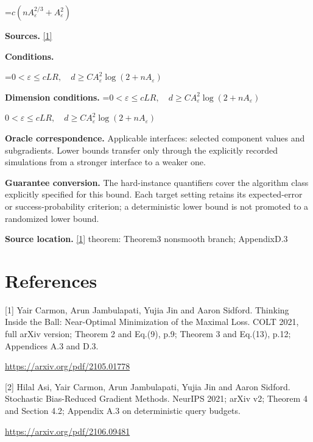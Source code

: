 \documentclass[10pt,a4paper]{article}
\newcommand{\AtlasMath}[1]{\par\begingroup\centering\setbox0=\hbox{$\displaystyle #1$}\ifdim\wd0>1.4\linewidth\typeout{ATLAS WIDE FORMULA: \the\wd0}\fi\ifdim\wd0>\linewidth\resizebox{\linewidth}{!}{\box0}\else\box0\fi\par\endgroup}
\newcommand{\AtlasInlineMath}[1]{\begingroup\setbox0=\hbox{$#1$}\ifdim\wd0>.4\linewidth\endgroup\AtlasMath{#1}\else\endgroup$#1$\fi}
\begin{document}
\AtlasMath{c(nA_\varepsilon^{2/3}+A_\varepsilon^2)}
\textbf{Sources.} \href{https://arxiv.org/pdf/2105.01778}{[1]}

\textbf{Conditions.} 
\AtlasMath{0<\varepsilon\le cLR,\quad d\ge C A_\varepsilon^2\log(2+nA_\varepsilon)}


\textbf{Dimension conditions.} \AtlasInlineMath{0<\varepsilon\le cLR,\quad d\ge C A_\varepsilon^2\log(2+nA_\varepsilon)}

\textbf{Oracle correspondence.} Applicable interfaces: selected component values and subgradients. Lower bounds transfer only through the explicitly recorded simulations from a stronger interface to a weaker one.

\textbf{Guarantee conversion.} The hard-instance quantifiers cover the algorithm class explicitly specified for this bound. Each target setting retains its expected-error or success-probability criterion; a deterministic lower bound is not promoted to a randomized lower bound.

\textbf{Source location.} \href{https://arxiv.org/pdf/2105.01778}{[1]} theorem: Theorem3 nonsmooth branch; AppendixD.3

\section{References}
[1] Yair Carmon, Arun Jambulapati, Yujia Jin and Aaron Sidford. Thinking Inside the Ball: Near-Optimal Minimization of the Maximal Loss. COLT 2021, full arXiv version; Theorem 2 and Eq.(9), p.9; Theorem 3 and Eq.(13), p.12; Appendices A.3 and D.3.

\url{https://arxiv.org/pdf/2105.01778}

[2] Hilal Asi, Yair Carmon, Arun Jambulapati, Yujia Jin and Aaron Sidford. Stochastic Bias-Reduced Gradient Methods. NeurIPS 2021; arXiv v2; Theorem 4 and Section 4.2; Appendix A.3 on deterministic query budgets.

\url{https://arxiv.org/pdf/2106.09481}
\end{document}
